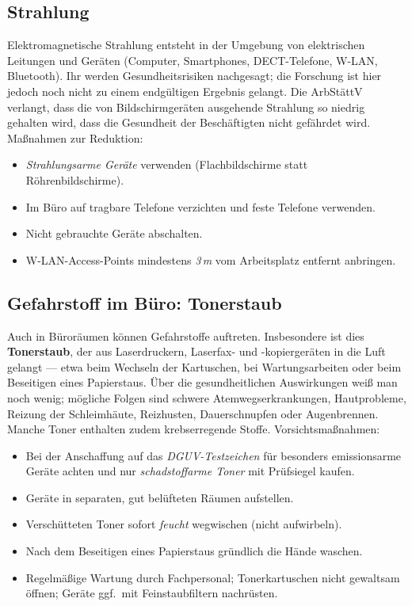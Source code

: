 \documentclass[11pt, a4paper]{article}
\begin{document}
\subsection{Strahlung}

Elektromagnetische Strahlung entsteht in der Umgebung von elektrischen Leitungen und
Geräten (Computer, Smartphones, DECT-Telefone, W-LAN, Bluetooth). Ihr werden
Gesundheitsrisiken nachgesagt; die Forschung ist hier jedoch noch nicht zu einem
endgültigen Ergebnis gelangt. Die ArbStättV verlangt, dass die von Bildschirmgeräten
ausgehende Strahlung so niedrig gehalten wird, dass die Gesundheit der Beschäftigten
nicht gefährdet wird. Maßnahmen zur Reduktion:

\begin{itemize}
  \item \emph{Strahlungsarme Geräte} verwenden (Flachbildschirme statt Röhrenbildschirme).
  \item Im Büro auf tragbare Telefone verzichten und feste Telefone verwenden.
  \item Nicht gebrauchte Geräte abschalten.
  \item W-LAN-Access-Points mindestens \emph{3\,m} vom Arbeitsplatz entfernt anbringen.
\end{itemize}

\subsection{Gefahrstoff im Büro: Tonerstaub}

Auch in Büroräumen können Gefahrstoffe auftreten. Insbesondere ist dies
\textbf{Tonerstaub}, der aus Laserdruckern, Laserfax- und -kopiergeräten in die Luft
gelangt --- etwa beim Wechseln der Kartuschen, bei Wartungsarbeiten oder beim Beseitigen
eines Papierstaus. Über die gesundheitlichen Auswirkungen weiß man noch wenig; mögliche
Folgen sind schwere Atemwegserkrankungen, Hautprobleme, Reizung der Schleimhäute,
Reizhusten, Dauerschnupfen oder Augenbrennen. Manche Toner enthalten zudem krebserregende
Stoffe. Vorsichtsmaßnahmen:

\begin{itemize}
  \item Bei der Anschaffung auf das \emph{DGUV-Testzeichen} für besonders emissionsarme
    Geräte achten und nur \emph{schadstoffarme Toner} mit Prüfsiegel kaufen.
  \item Geräte in separaten, gut belüfteten Räumen aufstellen.
  \item Verschütteten Toner sofort \emph{feucht} wegwischen (nicht aufwirbeln).
  \item Nach dem Beseitigen eines Papierstaus gründlich die Hände waschen.
  \item Regelmäßige Wartung durch Fachpersonal; Tonerkartuschen nicht gewaltsam öffnen;
    Geräte ggf.\ mit Feinstaubfiltern nachrüsten.
\end{itemize}
\end{document}
